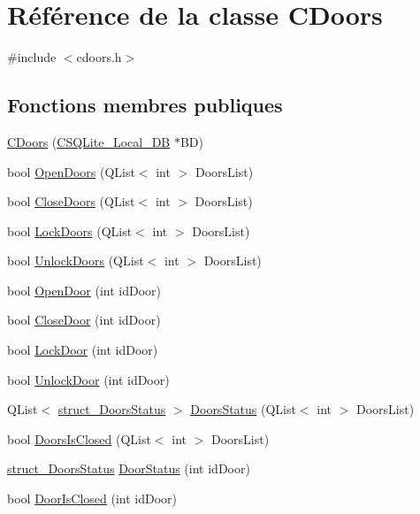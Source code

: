 \hypertarget{class_c_doors}{}\section{Référence de la classe C\+Doors}
\label{class_c_doors}


{\ttfamily \#include $<$cdoors.\+h$>$}

\subsection*{Fonctions membres publiques}
\begin{DoxyCompactItemize}
\item 
\hyperlink{class_c_doors_afb1998acfb81a71dafe73282069d57a7}{C\+Doors} (\hyperlink{class_c_s_q_lite___local___d_b}{C\+S\+Q\+Lite\+\_\+\+Local\+\_\+\+D\+B} $\ast$B\+D)
\item 
bool \hyperlink{class_c_doors_a23e1dec072702bf78eaa05332599e912}{Open\+Doors} (Q\+List$<$ int $>$ Doors\+List)
\item 
bool \hyperlink{class_c_doors_ac68dc2b9ae3f716b09f4c79560a0c047}{Close\+Doors} (Q\+List$<$ int $>$ Doors\+List)
\item 
bool \hyperlink{class_c_doors_a1954feca80181df85e4a59051387ff79}{Lock\+Doors} (Q\+List$<$ int $>$ Doors\+List)
\item 
bool \hyperlink{class_c_doors_a450ec2a776c3435103323a6e293f093f}{Unlock\+Doors} (Q\+List$<$ int $>$ Doors\+List)
\item 
bool \hyperlink{class_c_doors_ab4df5088482fdd8d84e3f1684f618a60}{Open\+Door} (int id\+Door)
\item 
bool \hyperlink{class_c_doors_a23416618cd95253a2158df4aed149985}{Close\+Door} (int id\+Door)
\item 
bool \hyperlink{class_c_doors_a3face9a42dff6689eca47e6777b1fad6}{Lock\+Door} (int id\+Door)
\item 
bool \hyperlink{class_c_doors_a773178973ccb5bb536a9c84c92e2fb29}{Unlock\+Door} (int id\+Door)
\item 
Q\+List$<$ \hyperlink{structstruct___doors_status}{struct\+\_\+\+Doors\+Status} $>$ \hyperlink{class_c_doors_a2d26d6cb0f578452071e7098fa21178d}{Doors\+Status} (Q\+List$<$ int $>$ Doors\+List)
\item 
bool \hyperlink{class_c_doors_a949bbc01ecb9ecc72ecb40b1b6b0b04c}{Doors\+Is\+Closed} (Q\+List$<$ int $>$ Doors\+List)
\item 
\hyperlink{structstruct___doors_status}{struct\+\_\+\+Doors\+Status} \hyperlink{class_c_doors_a178089d2a36fba6f8903d30c6d0e60ed}{Door\+Status} (int id\+Door)
\item 
bool \hyperlink{class_c_doors_aa93e30cb861205dc2e716504fdff1f0e}{Door\+Is\+Closed} (int id\+Door)
\end{DoxyCompactItemize}


